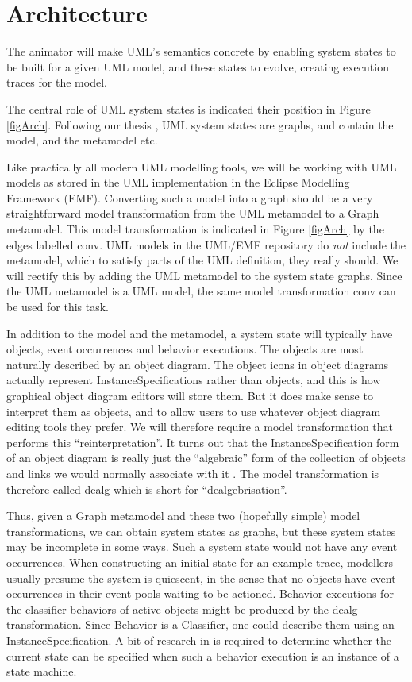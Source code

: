 \documentclass[a4paper]{article}
\begin{document}
\section{Architecture}
The animator will make UML's semantics concrete by enabling system
states to be built for a given UML model, and these states to evolve,
creating execution traces for the model.

The central role of UML system states is indicated their position in
Figure \ref{figArch}.  Following our thesis \cite{myThesis}, UML
system states are graphs, and contain the model, and the metamodel
etc.  

Like practically all modern UML modelling tools, we will be working
with UML models as stored in the UML implementation in the Eclipse
Modelling Framework (EMF).  Converting such a model into a graph
should be a very straightforward model transformation from the UML
metamodel to a Graph metamodel.  This model transformation is
indicated in Figure \ref{figArch} by the edges labelled {\sf conv}.
UML models in the UML/EMF repository do \emph{not} include the
metamodel, which to satisfy parts of the UML definition, they really
should.  We will rectify this by adding the UML metamodel to the
system state graphs.  Since the UML metamodel is a UML model, the same
model transformation {\sf conv} can be used for this task.

In addition to the model and the metamodel, a system state will
typically have objects, event occurrences and behavior executions.
The objects are most naturally described by an object diagram.  The
object icons in object diagrams actually represent
InstanceSpecifications rather than objects, and this is how graphical
object diagram editors will store them.  But it does make sense to
interpret them as objects, and to allow users to use whatever object
diagram editing tools they prefer.  We will therefore require a model
transformation that performs this ``reinterpretation''.  It turns out
that the InstanceSpecification form of an object diagram is really
just the ``algebraic'' form of the collection of objects and links we
would normally associate with it \cite{myThesis}.  The model
transformation is therefore called {\sf dealg} which is short for
``dealgebrisation''.  

Thus, given a Graph metamodel and these two (hopefully simple) model
transformations, we can obtain system states as graphs, but these
system states may be incomplete in some ways.  Such a system state
would not have any event occurrences.  When constructing an initial
state for an example trace, modellers usually presume the system is
quiescent, in the sense that no objects have event occurrences in
their event pools waiting to be actioned.  Behavior executions for the
classifier behaviors of active objects might be produced by the {\sf
  dealg} transformation.  Since Behavior is a Classifier, one could
describe them using an InstanceSpecification. A bit of research in
\cite{UML22super} is required to determine whether the current state
can be specified when such a behavior execution is an instance of a
state machine.
\end{document}
